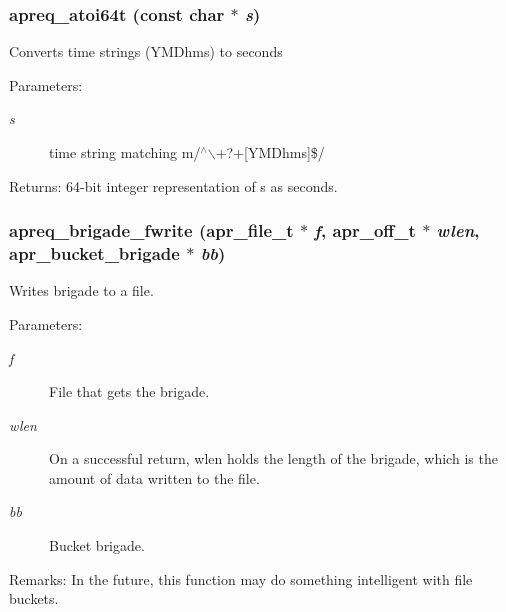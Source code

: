 \subsubsection{ apreq\_\-atoi64t (const char $\ast$ {\em s})}\label{group__Utils_a17}


Converts time strings (YMDhms) to seconds \begin{Desc}
\item[Parameters:]
\begin{description}
\item[{\em s}]time string matching m/$^\wedge$$\backslash$+?+[YMDhms]\$/ \end{description}
\end{Desc}
\begin{Desc}
\item[Returns:]64-bit integer representation of s as seconds. \end{Desc}
\subsubsection{ apreq\_\-brigade\_\-fwrite ({\bf apr\_\-file\_\-t} $\ast$ {\em f}, {\bf apr\_\-off\_\-t} $\ast$ {\em wlen}, {\bf apr\_\-bucket\_\-brigade} $\ast$ {\em bb})}\label{group__Utils_a18}


Writes brigade to a file. \begin{Desc}
\item[Parameters:]
\begin{description}
\item[{\em f}]File that gets the brigade. \item[{\em wlen}]On a successful return, wlen holds the length of the brigade, which is the amount of data written to the file. \item[{\em bb}]Bucket brigade. \end{description}
\end{Desc}
\begin{Desc}
\item[Remarks:]In the future, this function may do something intelligent with file buckets. \end{Desc}
